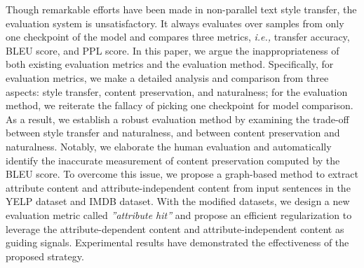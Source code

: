 Though remarkable efforts have been made in non-parallel text style transfer, the evaluation system is unsatisfactory. It always evaluates over samples from only one checkpoint of the model and compares three metrics, {\it i.e.,} transfer accuracy, BLEU score, and PPL score. In this paper, we argue the inappropriateness of both existing evaluation metrics and the evaluation method. Specifically, for evaluation metrics, we make a detailed analysis and comparison from three aspects: style transfer, content preservation, and naturalness; for the evaluation method, we reiterate the fallacy of picking one checkpoint for model comparison. As a result, we establish a robust evaluation method by examining the trade-off between style transfer and naturalness, and between content preservation and naturalness. Notably, we elaborate the human evaluation and automatically identify the inaccurate measurement of content preservation computed by the BLEU score. To overcome this issue, we propose a graph-based method to extract attribute content and attribute-independent content from input sentences in the Y{\small ELP} dataset and I{\small MDB} dataset. With the modified datasets, we design a new evaluation metric called \textit{''attribute hit''} and propose an efficient regularization to leverage the attribute-dependent content and attribute-independent content as guiding signals. Experimental results have demonstrated the effectiveness of the proposed strategy.
